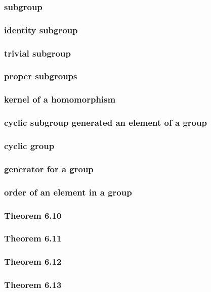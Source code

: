 \documentclass[a4paper]{article}
\begin{document}
\subsubsection*{subgroup}
\subsubsection*{identity subgroup}
\subsubsection*{trivial subgroup}
\subsubsection*{proper subgroups}
\subsubsection*{kernel of a homomorphism}
\subsubsection*{cyclic subgroup generated an element of a group}
\subsubsection*{cyclic group}
\subsubsection*{generator for a group}
\subsubsection*{order of an element in a group}
\subsubsection*{Theorem 6.10}
\subsubsection*{Theorem 6.11}
\subsubsection*{Theorem 6.12}
\subsubsection*{Theorem 6.13}

\newpage
\end{document}

